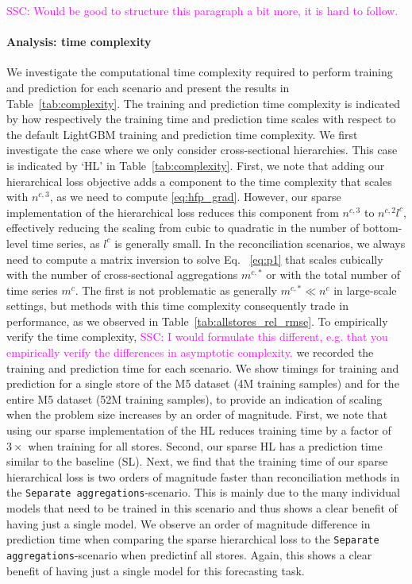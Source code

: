 \documentclass[preprint, 3p, times, twocolumn]{elsarticle}
\newcommand{\ssc}[1]{\textcolor{magenta}{SSC: #1.}}
\begin{document}
  \ssc{Would be good to structure this paragraph a bit more, it is hard to follow}
  \paragraph{Analysis: time complexity} We investigate the computational time complexity required to perform training and prediction for each scenario and present the results in Table~\ref{tab:complexity}. The training and prediction time complexity is indicated by how respectively the training time and prediction time scales with respect to the default LightGBM training and prediction time complexity. We first investigate the case where we only consider cross-sectional hierarchies. This case is indicated by `HL' in Table~\ref{tab:complexity}. First, we note that adding our hierarchical loss objective adds a component to the time complexity that scales with \(n^{c,3}\), as we need to compute \eqref{eq:hfp_grad}. However, our sparse implementation of the hierarchical loss reduces this component from \(n^{c,3}\) to \(n^{c,2}l^c\), effectively reducing the scaling from cubic to quadratic in the number of bottom-level time series, as \(l^c\) is generally small. In the reconciliation scenarios, we always need to compute a matrix inversion to solve Eq.~ \eqref{eq:p1} that scales cubically with the number of cross-sectional aggregations \(m^{c,*}\) or with the total number of time series \(m^c\). The first is not problematic as generally \(m^{c,*} \ll n^c\) in large-scale settings, but methods with this time complexity consequently trade in performance, as we observed in Table~\ref{tab:allstores_rel_rmse}. To empirically verify the time complexity, \ssc{I would formulate this different, e.g. that you empirically verify the differences in asymptotic complexity} we recorded the training and prediction time for each scenario. We show timings for training and prediction for a single store of the M5 dataset (4M training samples) and for the entire M5 dataset (52M training samples), to provide an indication of scaling when the problem size increases by an order of magnitude. First, we note that using our sparse implementation of the HL reduces training time by a factor of \(3\times\) when training for all stores. Second, our sparse HL has a prediction time similar to the baseline (SL). 
  Next, we find that the training time of our sparse hierarchical loss is two orders of magnitude faster than reconciliation methods in the \texttt{Separate aggregations}-scenario. This is mainly due to the many individual models that need to be trained in this scenario and thus shows a clear benefit of having just a single model. We observe an order of magnitude difference in prediction time when comparing the sparse hierarchical loss to the \texttt{Separate aggregations}-scenario when predictinf all stores. Again, this shows a clear benefit of having just a single model for this forecasting task. 
\end{document}
